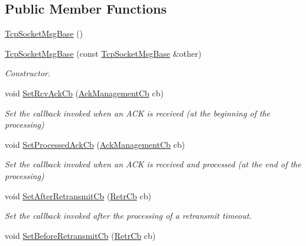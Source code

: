 \subsection*{Public Member Functions}
\begin{DoxyCompactItemize}
\item 
\hyperlink{classns3_1_1TcpSocketMsgBase_a867bfe6808ac466eb5b3e6449b04eea1}{Tcp\+Socket\+Msg\+Base} ()
\item 
\hyperlink{classns3_1_1TcpSocketMsgBase_a3e6c33ac9952b69af45605ea0710dcdd}{Tcp\+Socket\+Msg\+Base} (const \hyperlink{classns3_1_1TcpSocketMsgBase}{Tcp\+Socket\+Msg\+Base} \&other)
\begin{DoxyCompactList}\small\item\em Constructor. \end{DoxyCompactList}\item 
void \hyperlink{classns3_1_1TcpSocketMsgBase_a4ae6d1ea39fe99321a90d6580b62b006}{Set\+Rcv\+Ack\+Cb} (\hyperlink{classns3_1_1TcpSocketMsgBase_a266be95f5377eb857b8b6fa75fa92784}{Ack\+Management\+Cb} cb)
\begin{DoxyCompactList}\small\item\em Set the callback invoked when an A\+CK is received (at the beginning of the processing) \end{DoxyCompactList}\item 
void \hyperlink{classns3_1_1TcpSocketMsgBase_a63f56f3eb470da75e4a347923dd0d3dc}{Set\+Processed\+Ack\+Cb} (\hyperlink{classns3_1_1TcpSocketMsgBase_a266be95f5377eb857b8b6fa75fa92784}{Ack\+Management\+Cb} cb)
\begin{DoxyCompactList}\small\item\em Set the callback invoked when an A\+CK is received and processed (at the end of the processing) \end{DoxyCompactList}\item 
void \hyperlink{classns3_1_1TcpSocketMsgBase_a235a26662ec9afef088bfca7f6a277b4}{Set\+After\+Retransmit\+Cb} (\hyperlink{classns3_1_1TcpSocketMsgBase_a2b86195d79093ed98a9dfb7ccf635e67}{Retr\+Cb} cb)
\begin{DoxyCompactList}\small\item\em Set the callback invoked after the processing of a retransmit timeout. \end{DoxyCompactList}\item 
void \hyperlink{classns3_1_1TcpSocketMsgBase_a77cb047b2301736063e4d925f910be34}{Set\+Before\+Retransmit\+Cb} (\hyperlink{classns3_1_1TcpSocketMsgBase_a2b86195d79093ed98a9dfb7ccf635e67}{Retr\+Cb} cb)

\end{DoxyCompactItemize}
